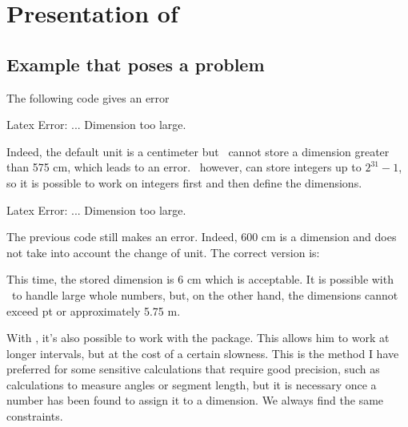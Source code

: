 \section{Presentation of }

\subsection{Example that poses a problem  }

The following code gives an error

\begin{tkzltxexample}[right margin=7cm]
\end{tkzltxexample}
 {\color{red} Latex Error: ... Dimension too large.}

Indeed, the default unit is a centimeter but \TEX\ cannot store a dimension
greater than 575 cm, which leads to an error. \TEX\ however, can store integers
up to $2^{31}-1$, so it is possible to work on integers first and then define
the dimensions.

\begin{tkzltxexample}[right margin=7cm]
\end{tkzltxexample}

{\color{red} Latex Error: ... Dimension too large.}

The previous code still makes an error. Indeed, 600 cm is a dimension
and does not take into account the change of unit. The correct version is:

\begin{tkzltxexample}[right margin=7cm]
\end{tkzltxexample}

This time, the stored dimension is $6$ cm which is acceptable. It is possible with
\TEX\ to handle large whole numbers, but, on the other hand, the dimensions
cannot exceed  pt or approximately 5.75 m.

With \TEX, it's also possible to work with the  package. This
allows him to work at longer intervals, but at the cost of a certain slowness.
This is the method I have preferred for some sensitive calculations that require
good precision, such as calculations to measure angles or segment length, but it
is necessary once a number has been found to assign it to a dimension. We always
find the same constraints.

